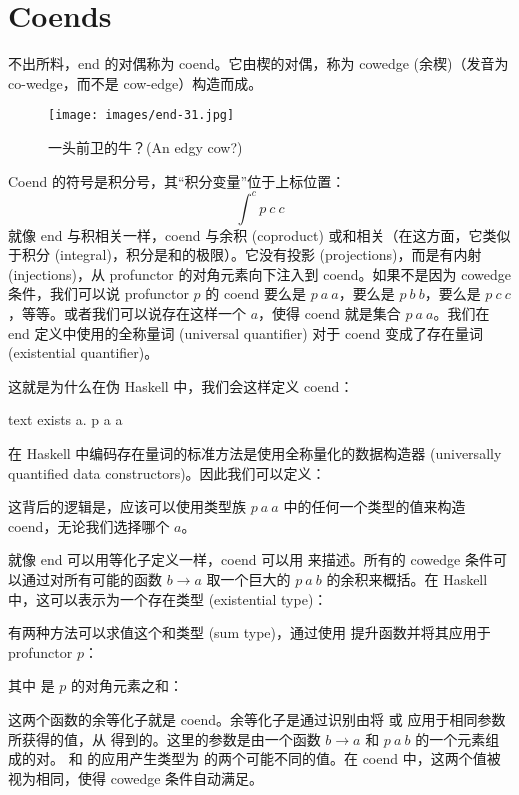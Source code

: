 \section{Coends}
不出所料，end 的对偶称为 coend。它由楔的对偶，称为 cowedge (余楔)（发音为 co-wedge，而不是 cow-edge）构造而成。

\begin{figure}[H]
  \centering
  \texttt{[image: images/end-31.jpg]}
  \caption{一头前卫的牛？(An edgy cow?)}
\end{figure}

\noindent
Coend 的符号是积分号，其“积分变量”位于上标位置：
\[\int^c p\ c\ c\]
就像 end 与积相关一样，coend 与余积 (coproduct) 或和相关（在这方面，它类似于积分 (integral)，积分是和的极限）。它没有投影 (projections)，而是有内射 (injections)，从 profunctor 的对角元素向下注入到 coend。如果不是因为 cowedge 条件，我们可以说 profunctor $p$ 的 coend 要么是 $p\ a\ a$，要么是 $p\ b\ b$，要么是 $p\ c\ c$，等等。或者我们可以说存在这样一个 $a$，使得 coend 就是集合 $p\ a\ a$。我们在 end 定义中使用的全称量词 (universal quantifier) 对于 coend 变成了存在量词 (existential quantifier)。

这就是为什么在伪 Haskell 中，我们会这样定义 coend：

\begin{snip}{text}
exists a. p a a
\end{snip}
在 Haskell 中编码存在量词的标准方法是使用全称量化的数据构造器 (universally quantified data constructors)。因此我们可以定义：

这背后的逻辑是，应该可以使用类型族 $p\ a\ a$ 中的任何一个类型的值来构造 coend，无论我们选择哪个 $a$。

就像 end 可以用等化子定义一样，coend 可以用  来描述。所有的 cowedge 条件可以通过对所有可能的函数 $b \to a$ 取一个巨大的 $p\ a\ b$ 的余积来概括。在 Haskell 中，这可以表示为一个存在类型 (existential type)：

有两种方法可以求值这个和类型 (sum type)，通过使用  提升函数并将其应用于 profunctor $p$：

其中  是 $p$ 的对角元素之和：

这两个函数的余等化子就是 coend。余等化子是通过识别由将  或  应用于相同参数所获得的值，从  得到的。这里的参数是由一个函数 $b \to a$ 和 $p\ a\ b$ 的一个元素组成的对。 和  的应用产生类型为  的两个可能不同的值。在 coend 中，这两个值被视为相同，使得 cowedge 条件自动满足。

